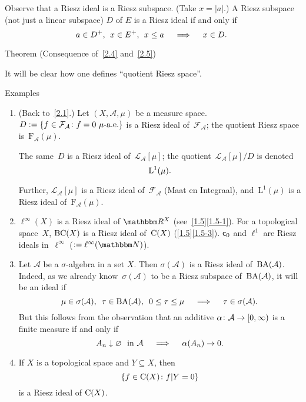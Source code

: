 \documentclass[main.tex]{subfiles}
\begin{document}
Observe that a Riesz ideal is a Riesz subspace. 
(Take $x=|a|$.)
A Riesz subspace (not just a linear subspace) $D$ of $E$
is a Riesz ideal if and only if 
\begin{equation*}
a\in D^+\text{, }\; x\in E^+\text{, }\; x\leq a 
  \quad \implies \quad x\in D\text{. }
\end{equation*}
%
%
\begin{psec}{2.7}{Theorem} (Consequence of~\ref{2.4} and~\ref{2.5})\ 

It will be clear
how one defines
``quotient Riesz space''.
\end{psec}
%
%
\begin{psec}{2.8}{Examples}
\begin{enumerate}
\item \label{2.8-1}%
(Back to~\ref{2.1}.)
Let $(X,\mathcal A, \mu)$ be a measure space.
$D:=\{f\in {\mathcal F}_{\mathcal A}\colon f=0\ \mu\text{-a.e.} \}$
is a Riesz ideal of~${\mathcal F}_{\mathcal A}$;
the quotient Riesz space is~$\mathrm{F}_{\mathcal A} (\mu)$.

The same~$D$ is a Riesz ideal of~$\mathcal{L}_{\mathcal A}[\mu]$;
the quotient~${\mathcal L}_{\mathcal A}[\mu]/D$ is denoted
\begin{equation*}
\mathrm{L}^1(\mu)\text{.}
\end{equation*}

Further,
$\mathcal{L}_{\mathcal A}[\mu]$ 
is a Riesz ideal of~${\mathcal F}_{\mathcal A}$
(Maat en Integraal),
and~$\mathrm{L}^1(\mu)$ is a Riesz ideal of~$\mathrm{F}_{\mathcal A}(\mu)$.
%
\item \label{2.8-2}
$\ell^\infty(X)$ is a Riesz ideal of $\R^X$ (see~\ref{1.5}\ref{1.5-1}).
For a topological space~$X$, 
$\mathrm{BC}(X)$ is a Riesz ideal 
of~$\mathrm{C}(X)$ (\ref{1.5}\ref{1.5-3}).
$\mathsf{c}_0$ and $\ell^1$ are Riesz ideals 
in~$\ell^\infty$ ($:=\ell^\infty(\N)$).
%
\item \label{2.8-3}
Let $\mathcal A$ be a $\sigma$-algebra in a set $X$.
Then $\sigma(\mathcal A)$ is a Riesz ideal of~$\mathrm{BA}(\mathcal A)$.
Indeed, as we already know~$\sigma(\mathcal A)$ 
to be a Riesz subspace of~$\mathrm{BA}(\mathcal A)$,
it will be an ideal if
\begin{equation*}
\mu\in \sigma(\mathcal A)\htam{, }\ 
\tau\in\BA(\mathcal A)\htam{, }\ 
0\leq \tau\leq \mu
\quad \implies \quad
\tau \in \sigma(\mathcal A)
\htam{.}
\end{equation*}
But this follows from the observation
that an additive $\alpha\colon\mathcal A\rightarrow [0,\infty)$
is a finite measure if and only if
\begin{equation*}
A_n \downarrow \varnothing\ \text{ in }\mathcal A 
\quad \implies \quad
\alpha(A_n)\rightarrow 0
\text{.}
\end{equation*}
%
\item \label{2.8-4}
If $X$ is a topological space and $Y\subseteq X$, then
\begin{equation*}
\{f\in\mathrm{C}(X)\colon f | Y=0 \}
\end{equation*}
is a Riesz ideal of $\mathrm{C}(X)$.


\end{enumerate}
\end{psec}
\end{document}
